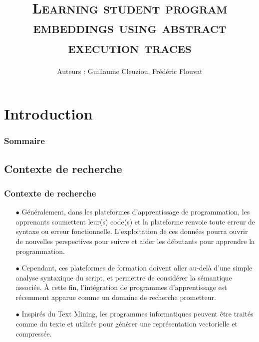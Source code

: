\documentclass[xcolor=dvipsnames]{beamer}
\title[Learning program embeddings]{\textsc{Learning student program embeddings using abstract execution traces}}
\institute{\large{\texttt{Présentateur : Hao ZHANG}}}
\author{Auteurs : Guillaume Cleuziou, Frédéric Flouvat}
\date{\displaydate{date}}
\begin{document}
\begin{frame}
	\titlepage
\end{frame}

\section{Introduction}

\begin{frame}
\frametitle{Sommaire}
\tableofcontents[currentsection]
\end{frame}

\subsection{Contexte de recherche}
\begin{frame}
\frametitle{Contexte de recherche}
\begin{itemize}
\item[$\bullet$] Généralement, dans les plateformes d’apprentissage de programmation, les apprenants soumettent leur(s) code(s) et la plateforme renvoie toute erreur de syntaxe ou erreur fonctionnelle. L'exploitation de ces données pourra ouvrir de nouvelles perspectives pour suivre et aider les débutants pour apprendre la programmation.

\item[$\bullet$] Cependant, ces plateformes de formation doivent aller au-delà d'une simple analyse syntaxique du script, et permettre de considérer la sémantique associée. À cette fin, l'intégration de programmes d'apprentissage est récemment apparue comme un domaine de recherche prometteur.

\item[$\bullet$] Inspirés du Text Mining, les programmes informatiques peuvent être traités comme du texte et utilisés pour générer une représentation vectorielle et compressée.
\end{itemize}
\end{frame}
\end{document}
